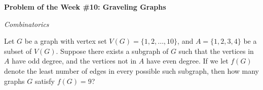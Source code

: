 \begin{potw}\vspace{5pt}
{\large\textbf{Problem of the Week \#10: Graveling Graphs}}\vspace{5pt}

\textit{Combinatorics}\V

Let $G$ be a graph with vertex set $V(G) = \{1,2,\hdots, 10\}$, and $A = \{1,2,3,4\}$ be a subset of $V(G)$. Suppose there exists a subgraph of $G$ such that the vertices in $A$ have odd degree, and the vertices not in $A$ have even degree. If we let $f(G)$ denote the least number of edges in every possible such subgraph, then how many graphs $G$ satisfy $f(G) = 9$?
\end{potw}\V
